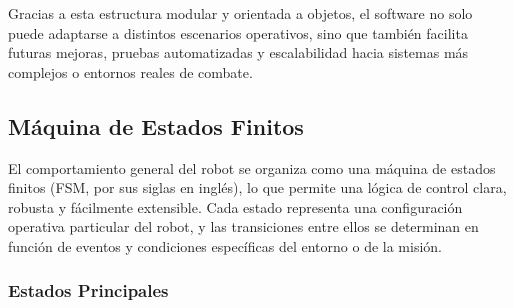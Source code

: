 Gracias a esta estructura modular y orientada a objetos, el software no solo puede adaptarse a distintos escenarios operativos, sino que también facilita futuras mejoras, pruebas automatizadas y escalabilidad hacia sistemas más complejos o entornos reales de combate.

\subsection{Máquina de Estados Finitos}

El comportamiento general del robot se organiza como una máquina de estados finitos (FSM, por sus siglas en inglés), lo que permite una lógica de control clara, robusta y fácilmente extensible. Cada estado representa una configuración operativa particular del robot, y las transiciones entre ellos se determinan en función de eventos y condiciones específicas del entorno o de la misión.

\subsubsection{Estados Principales}

